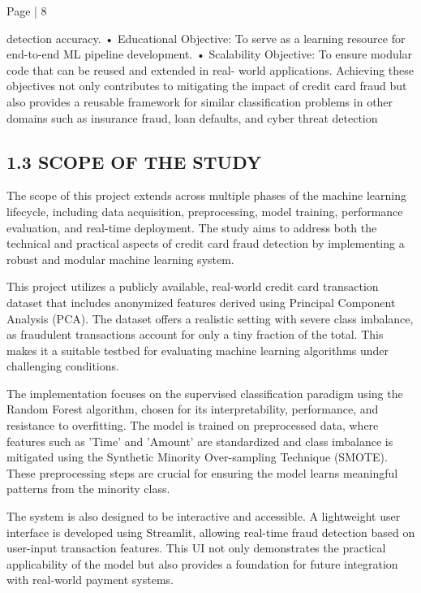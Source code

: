 \documentclass[11pt,a4paper]{article}
\begin{document}
Page | 8  

\newpage

detection accuracy. 
• 
Educational Objective: To serve as a learning resource for end-to-end ML pipeline 
development. 
• 
Scalability Objective: To ensure modular code that can be reused and extended in real-
world applications. 
Achieving these objectives not only contributes to mitigating the impact of credit card fraud 
but also provides a reusable framework for similar classification problems in other domains 
such as insurance fraud, loan defaults, and cyber threat detection 

\subsection*{  1.3 SCOPE OF THE STUDY }

The scope of this project extends across multiple phases of the machine learning lifecycle, including 
data acquisition, preprocessing, model training, performance evaluation, and real-time deployment. 
The study aims to address both the technical and practical aspects of credit card fraud detection by 
implementing a robust and modular machine learning system. 

This project utilizes a publicly available, real-world credit card transaction dataset that includes 
anonymized features derived using Principal Component Analysis (PCA). The dataset offers a 
realistic setting with severe class imbalance, as fraudulent transactions account for only a tiny fraction 
of the total. This makes it a suitable testbed for evaluating machine learning algorithms under 
challenging conditions. 

The implementation focuses on the supervised classification paradigm using the Random Forest 
algorithm, chosen for its interpretability, performance, and resistance to overfitting. The model is 
trained on preprocessed data, where features such as 'Time' and 'Amount' are standardized and class 
imbalance is mitigated using the Synthetic Minority Over-sampling Technique (SMOTE). These 
preprocessing steps are crucial for ensuring the model learns meaningful patterns from the minority 
class. 

The system is also designed to be interactive and accessible. A lightweight user interface is developed 
using Streamlit, allowing real-time fraud detection based on user-input transaction features. This UI 
not only demonstrates the practical applicability of the model but also provides a foundation for future 
integration with real-world payment systems. 
\end{document}
